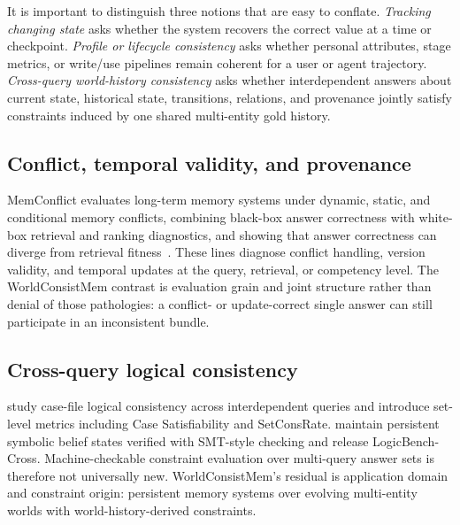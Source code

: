 It is important to distinguish three notions that are easy to conflate. \emph{Tracking changing state} asks whether the system recovers the correct value at a time or checkpoint. \emph{Profile or lifecycle consistency} asks whether personal attributes, stage metrics, or write/use pipelines remain coherent for a user or agent trajectory. \emph{Cross-query world-history consistency} asks whether interdependent answers about current state, historical state, transitions, relations, and provenance jointly satisfy constraints induced by one shared multi-entity gold history.

\subsection{Conflict, temporal validity, and provenance}

MemConflict evaluates long-term memory systems under dynamic, static, and conditional memory conflicts, combining black-box answer correctness with white-box retrieval and ranking diagnostics, and showing that answer correctness can diverge from retrieval fitness~\citep{tao2026memConflict}. These lines diagnose conflict handling, version validity, and temporal updates at the query, retrieval, or competency level. The WorldConsistMem contrast is evaluation grain and joint structure rather than denial of those pathologies: a conflict- or update-correct single answer can still participate in an inconsistent bundle.

\subsection{Cross-query logical consistency}

\citet{salla2026crossQueryContradictions} study case-file logical consistency across interdependent queries and introduce set-level metrics including Case Satisfiability and SetConsRate. \citet{chaudhry2026logicVault} maintain persistent symbolic belief states verified with SMT-style checking and release LogicBench-Cross. Machine-checkable constraint evaluation over multi-query answer sets is therefore not universally new. WorldConsistMem's residual is application domain and constraint origin: persistent memory systems over evolving multi-entity worlds with world-history-derived constraints.

